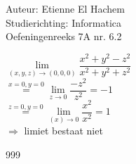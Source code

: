 \documentclass[a4paper]{article}
\begin{document}
  
\noindent \large Auteur: Etienne El Hachem \\
\noindent \large Studierichting: Informatica\\
\noindent \large Oefeningenreeks 7A nr. 6.2\\

\medskip

\normalsize

$ \lim\limits_{(x,y,z)\rightarrow (0,0,0)}\dfrac{x^2 + y^2 - z^2}{x^2 + y^2 + z^2} $\\

$ \stackrel{x = 0, y = 0}{=} \lim\limits_{z \rightarrow 0}\dfrac{-z^2}{z^2} = -1 $\\

$ \stackrel{z = 0, y = 0}{=} \lim\limits_{(x)\rightarrow 0}\dfrac{x^2}{x^2} = 1 $\\

$ \Rightarrow $ limiet bestaat niet \\

\begin{thebibliography}{999}
\end{thebibliography}
\end{document}
